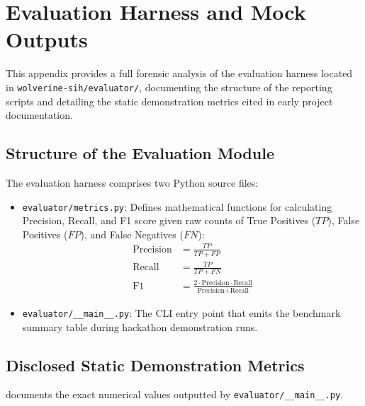 \chapter{Evaluation Harness and Mock Outputs}
\label{app:evaluation-harness}

This appendix provides a full forensic analysis of the evaluation harness located in \texttt{wolverine-sih/evaluator/}, documenting the structure of the reporting scripts and detailing the static demonstration metrics cited in early project documentation.

\section{Structure of the Evaluation Module}
The evaluation harness comprises two Python source files:
\begin{itemize}
    \item \texttt{evaluator/metrics.py}: Defines mathematical functions for calculating Precision, Recall, and F1 score given raw counts of True Positives ($TP$), False Positives ($FP$), and False Negatives ($FN$):
    \begin{align}
    \label{eq:prec-rec-f1}
    \text{Precision} &= \frac{TP}{TP + FP} \\
    \text{Recall} &= \frac{TP}{TP + FN} \\
    \text{F1} &= \frac{2 \cdot \text{Precision} \cdot \text{Recall}}{\text{Precision} + \text{Recall}}
    \end{align}
    \item \texttt{evaluator/\_\_main\_\_.py}: The CLI entry point that emits the benchmark summary table during hackathon demonstration runs.
\end{itemize}

\section{Disclosed Static Demonstration Metrics}
 documents the exact numerical values outputted by \texttt{evaluator/\_\_main\_\_.py}.

